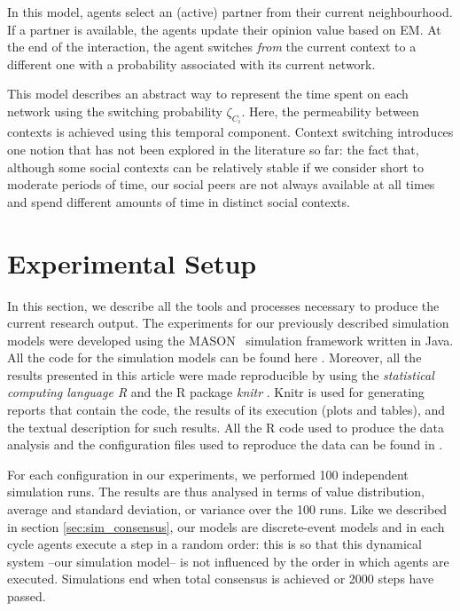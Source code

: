 \documentclass[preprint,number]{elsarticle}
\begin{document}
	\noindent In this model, agents select an (active) partner from their current neighbourhood. If a partner is available, the agents update their opinion value based on EM. At the end of the interaction, the agent switches \textit{from} the current context to a different one with a probability associated with its current network. 
	
	This model describes an abstract way to represent the time spent on each network using the switching probability $\zeta_{C_i}$. Here, the permeability between contexts is achieved using this temporal component. Context switching introduces one notion that has not been explored in the literature so far: the fact that, although some social contexts can be relatively stable if we consider short to moderate periods of time, our social peers are not always available at all times and spend different amounts of time in distinct social contexts.
	
	\section{Experimental Setup}
	\label{sec:experimental-setup}
\noindent In this section, we describe all the tools and processes necessary to produce the current research output. The experiments for our previously described simulation models were developed using the MASON~\cite{Luke2005} simulation framework written in Java. All the code for the simulation models can be found here \cite{Nunes:Software:11067}. Moreover, all the results presented in this article were made reproducible by using the \textit{statistical computing language R} \cite{R2008} and the R package \textit{knitr} \cite{knitr2014}. Knitr is used for generating reports that contain the code, the results of its execution (plots and tables), and the textual description for such results. All the R code used  to produce the data analysis and the configuration files used to reproduce the data can be found in \cite{NunesAntunes2014:Analysis:11898}.

For each configuration in our experiments, we performed 100 independent simulation runs. The results are thus analysed in terms of value distribution, average and standard deviation, or variance over the 100 runs. Like we described in section \ref{sec:sim_consensus}, our models are discrete-event models and in each cycle agents execute 
a step in a random order: this is so that this dynamical system --our simulation model-- is not influenced by the order in which agents are executed. Simulations end when total consensus is achieved or 2000 steps have passed.  
\end{document}
